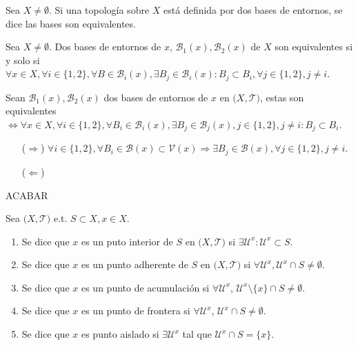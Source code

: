 \begin{defn}
  Sea $X \neq \emptyset$. Si una topología sobre $X$ está definida por dos bases de entornos, se dice las bases son equivalentes.
\end{defn}

\begin{prop}
  Sea $X \neq \emptyset$. Dos bases de entornos de $x$, $\mathcal{B}_{1}(x), \mathcal{B}_{2}(x)$ de $X$ son equivalentes si y solo si $\forall x \in X, \forall i \in \{ 1,2 \}, \forall B \in \mathcal{B}_{i}(x), \exists B_{j} \in \mathcal{B}_{i}(x): B_{j} \subset B_{i}, \forall j \in \{ 1,2 \}, j \neq i$.
\end{prop}

\begin{prop}
Sean $\mathcal{B}_{1}(x), \mathcal{B}_{2}(x)$ dos bases de entornos de $x$ en $\big( X, \mathcal{T} \big)$, estas son equivalentes $\Leftrightarrow \forall x \in X, \forall i \in \{ 1, 2 \}, \forall B_{i} \in \mathcal{B}_{i}(x), \exists B_{j} \in \mathcal{B}_{j}(x), j \in \{ 1, 2 \}, j \neq i : B_{j} \subset B_{i}$.
\end{prop}

\begin{dem}
  \begin{enumerate}[label=(\roman*)]
    \item [($\Rightarrow$)] $\forall i \in \{ 1,2 \}, \forall B_{i} \in \mathcal{B}(x) \subset \mathcal{V}(x) \Rightarrow \exists B_{j} \in \mathcal{B}(x), \forall j \in \{  1,2 \}, j \neq i$.
    \item [($\Leftarrow$)]
  \end{enumerate} ACABAR
\end{dem}

\begin{defn}
  Sea $\big( X, \mathcal{T} \big)$ e.t. $S \subset X, x \in X$.
  \begin{enumerate}[label=(\roman*)]
    \item Se dice que $x$ es un puto interior de $S$ en $\big( X, \mathcal{T} \big)$ si $\exists \mathcal{U}^{x}: \mathcal{U}^{x} \subset S$.
    \item Se dice que $x$ es un punto adherente de $S$ en $\big( X, \mathcal{T} \big)$ si $\forall \mathcal{U}^{x}, \mathcal{U}^{x} \cap S \neq \emptyset$.
    \item Se dice que $x$ es un punto de acumulación si $\forall \mathcal{U}^{x}$, $ \mathcal{U}^{x} \setminus \{ x \} \cap S \neq \emptyset$.
    \item Se dice que $x$ es un punto de frontera si $ \forall \mathcal{U}^{x}$, $ \mathcal{U}^{x}\cap S \neq  \emptyset$.
    \item Se dice que $x$ es punto aislado si $ \exists \mathcal{U}^{x}$ tal que $\mathcal{U}^{x} \cap S = \{ x \}$.
  \end{enumerate}
\end{defn}

